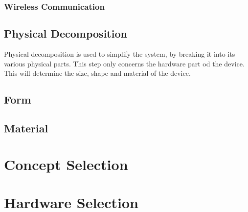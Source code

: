 \subsubsection{Wireless Communication}

\subsection{Physical Decomposition}
Physical decomposition is used to simplify the system, by breaking it into its various physical parts. This step only concerns the hardware part od the device. This will determine the size, shape and material of the device.

\subsection{Form}
\subsection{Material}

\section{Concept Selection}
\section{Hardware Selection}





